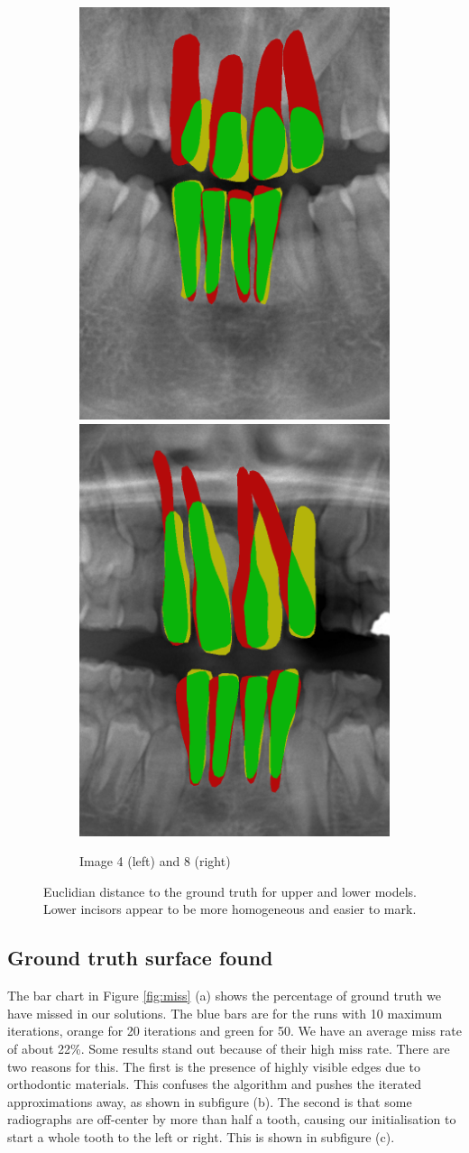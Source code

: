 \documentclass[a4paper,titlepage,12pt]{article}
\begin{document}
\begin{figure}
\begin{subfigure}{0.65\linewidth}
		\centering
		\includegraphics[width=0.45\columnwidth]{results/8i10}
		\includegraphics[width=0.45\columnwidth]{results/4i50}
		\caption{Image 4 (left) and 8 (right)}
	\end{subfigure}
	\caption{Euclidian distance to the ground truth for upper and lower models. Lower incisors appear to be more homogeneous and easier to mark. } 
	\label{fig:euclud}
\end{figure}

\subsection{Ground truth surface found}
The bar chart in Figure \ref{fig:miss} (a) shows the percentage of ground truth we have missed in our solutions. The {\color{blue} blue} bars are for the runs with 10 maximum iterations, {\color{orange} orange} for 20 iterations and {\color{green} green} for 50. We have an average miss rate of about 22\%. Some results stand out because of their high miss rate. There are two reasons for this. The first is the presence of highly visible edges due to orthodontic materials. This confuses the algorithm and pushes the iterated approximations away, as shown in subfigure (b). The second is that some radiographs are off-center by more than half a tooth, causing our initialisation to start a whole tooth to the left or right. This is shown in subfigure (c). 
\end{document}
